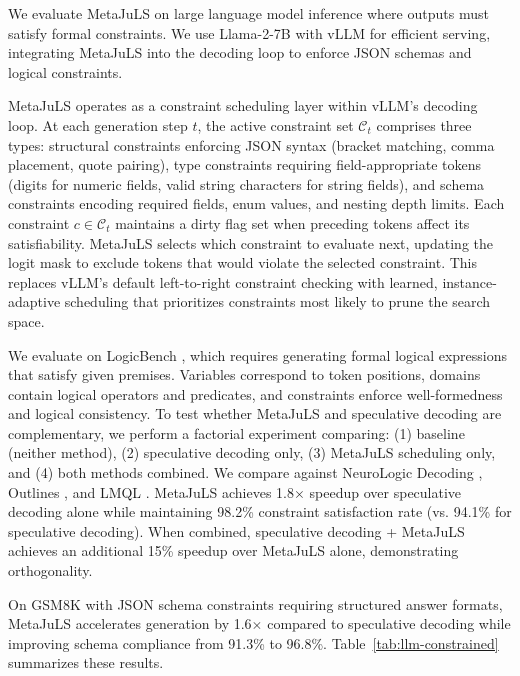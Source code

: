 \documentclass[11pt]{article}
\begin{document}
We evaluate MetaJuLS on large language model inference where outputs must satisfy formal constraints. We use Llama-2-7B \citep{touvron2023llama} with vLLM \citep{kwon2023efficient} for efficient serving, integrating MetaJuLS into the decoding loop to enforce JSON schemas and logical constraints.

MetaJuLS operates as a constraint scheduling layer within vLLM's decoding loop. At each generation step $t$, the active constraint set $\mathcal{C}_t$ comprises three types: structural constraints enforcing JSON syntax (bracket matching, comma placement, quote pairing), type constraints requiring field-appropriate tokens (digits for numeric fields, valid string characters for string fields), and schema constraints encoding required fields, enum values, and nesting depth limits. Each constraint $c \in \mathcal{C}_t$ maintains a dirty flag set when preceding tokens affect its satisfiability. MetaJuLS selects which constraint to evaluate next, updating the logit mask to exclude tokens that would violate the selected constraint. This replaces vLLM's default left-to-right constraint checking with learned, instance-adaptive scheduling that prioritizes constraints most likely to prune the search space.

We evaluate on LogicBench \citep{chen2024logicbench}, which requires generating formal logical expressions that satisfy given premises. Variables correspond to token positions, domains contain logical operators and predicates, and constraints enforce well-formedness and logical consistency. To test whether MetaJuLS and speculative decoding are complementary, we perform a factorial experiment comparing: (1) baseline (neither method), (2) speculative decoding only, (3) MetaJuLS scheduling only, and (4) both methods combined. We compare against NeuroLogic Decoding \citep{lu2021neurologic}, Outlines \citep{willard2023outlines}, and LMQL \citep{beurer2023lmql}. MetaJuLS achieves 1.8$\times$ speedup over speculative decoding alone while maintaining 98.2\% constraint satisfaction rate (vs. 94.1\% for speculative decoding). When combined, speculative decoding + MetaJuLS achieves an additional 15\% speedup over MetaJuLS alone, demonstrating orthogonality.

On GSM8K \citep{cobbe2021training} with JSON schema constraints requiring structured answer formats, MetaJuLS accelerates generation by 1.6$\times$ compared to speculative decoding while improving schema compliance from 91.3\% to 96.8\%. Table~\ref{tab:llm-constrained} summarizes these results.
\end{document}
